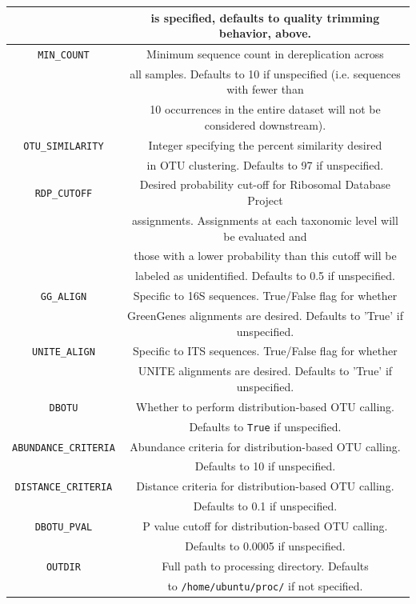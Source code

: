 \documentclass[11pt, oneside]{article}   	%
\begin{document}
\begin{center}
\begin{longtable}{| c | c |}
		& is specified, defaults to quality trimming behavior, above. \\
		\hline
        {\tt MIN\_COUNT} & Minimum sequence count in dereplication across \\
        & all samples.  Defaults to 10 if unspecified (i.e. sequences with fewer than  \\
        & 10 occurrences in the entire dataset will not be considered downstream). \\
        \hline
        {\tt OTU\_SIMILARITY} & Integer specifying the percent similarity desired \\
         &  in OTU clustering.  Defaults to 97 if unspecified. \\
	\hline
	{\tt RDP\_CUTOFF} & Desired probability cut-off for Ribosomal Database Project \\
	& assignments.  Assignments at each taxonomic level will be evaluated and \\
	& those with a lower probability than this cutoff will be \\
	& labeled as unidentified. Defaults to 0.5 if unspecified. \\
	\hline
	{\tt GG\_ALIGN} & Specific to 16S sequences.  True/False flag for whether \\
	& GreenGenes alignments are desired.  Defaults to 'True' if unspecified. \\
	\hline
	{\tt UNITE\_ALIGN} & Specific to ITS sequences.  True/False flag for whether \\
	& UNITE alignments are desired.  Defaults to 'True' if unspecified. \\
	\hline
        {\tt DBOTU} & Whether to perform distribution-based OTU calling. \\
         &  Defaults to {\tt True} if unspecified. \\
	\hline
        {\tt ABUNDANCE\_CRITERIA} & Abundance criteria for distribution-based OTU calling. \\
         &  Defaults to 10 if unspecified. \\
	\hline
        {\tt DISTANCE\_CRITERIA} & Distance criteria for distribution-based OTU calling. \\
         &  Defaults to 0.1 if unspecified. \\
	\hline
        {\tt DBOTU\_PVAL} & P value cutoff for distribution-based OTU calling. \\
         &  Defaults to 0.0005 if unspecified. \\
	\hline
	{\tt OUTDIR} & Full path to processing directory. Defaults \\
	& to {\tt /home/ubuntu/proc/} if not specified. \\
	\hline
\end{longtable}
\end{center}
\end{document}
